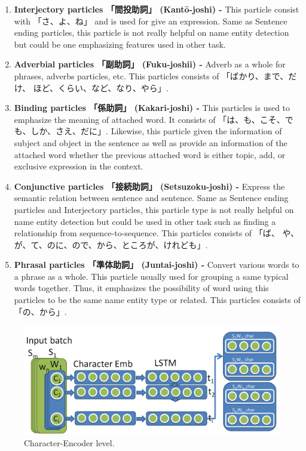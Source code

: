 \begin{CJK*}{UTF8}{min}
\begin{enumerate}
    \item \textbf{Interjectory particles 「間投助詞」 (Kantō-joshi) -}
     This particle consist with 「さ、よ、ね」 and is used for give an expression.
     Same as Sentence ending particles, this particle is not really helpful on name entity detection but could be one emphasizing features used in other task.
     
    \item \textbf{Adverbial particles 「副助詞」 (Fuku-joshii) -}
    Adverb as a whole for phrases, adverbs particles, etc.
    This particles consists of 「ばかり、まで、だけ、 ほど、くらい、など、なり、やら」.


    \item \textbf{Binding particles 「係助詞」 (Kakari-joshi) -}
    This particles is used to emphasize the meaning of attached word.
    It consists of 「は、も、こそ、で も、しか、さえ、だに」.
    Likewise, this particle given the information of subject and object in the sentence as well as provide an information of the attached word whether the previous attached word is either topic, add, or exclusive expression in the context.

    
    \item \textbf{Conjunctive particles 「接続助詞」 (Setsuzoku-joshi) -}
    Express the semantic relation between sentence and sentence.
    Same as Sentence ending particles and Interjectory particles, this particle type is not really helpful on name entity detection but could be used in other task such as finding a relationship from sequence-to-sequence.
    This particles consists of 「ば、 や、が、て、のに、ので、から、ところが、けれども」.
    
    \item \textbf{Phrasal particles 「準体助詞」 (Juntai-joshi) -}
    Convert various words to a phrase as a whole.
    This particle usually used for grouping a same typical words together.
    Thus, it emphasizes the possibility of word using this particles to be the same name entity type or related.
    This particles consists of 「の、から」.

\end{enumerate}

\begin{figure}[!h]
  \includegraphics[scale=0.3]{character_encoder.png}
  \caption{Character-Encoder level.}
  \label{fig:chaenc}
\end{figure}


\end{CJK*}
